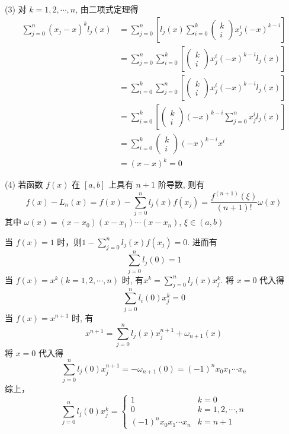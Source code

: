 \begin{tcolorbox}
(3) 对 $ k=1,2, \cdots, n $, 由二项式定理得
$$
\begin{aligned}
\sum_{j=0}^{n}\left(x_{j}-x\right)^{k} l_{j}(x) & =\sum_{j=0}^{n}\left[l_{j}(x) \sum_{i=0}^{k}\left(\begin{array}{l}
k \\
i
\end{array}\right) x_{j}^{i}(-x)^{k-i}\right] \\
& =\sum_{j=0}^{n} \sum_{i=0}^{k}\left[\left(\begin{array}{l}
k \\
i
\end{array}\right) x_{j}^{i}(-x)^{k-i} l_{j}(x)\right] \\
& =\sum_{i=0}^{k} \sum_{j=0}^{n}\left[\left(\begin{array}{l}
k \\
i
\end{array}\right) x_{j}^{i}(-x)^{k-i} l_{j}(x)\right] \\
& =\sum_{i=0}^{k}\left[\left(\begin{array}{l}
k \\
i
\end{array}\right)(-x)^{k-i} \sum_{j=0}^{n} x_{j}^{i} l_{j}(x)\right] \\
& =\sum_{i=0}^{k}\left(\begin{array}{l}
k \\
i
\end{array}\right)(-x)^{k-i} x^{i} \\
& =(x-x)^{k}=0
\end{aligned}
$$


(4) 若函数 $ f(x) $ 在 $ [a, b] $ 上具有 $ n+1 $ 阶导数, 则有
$$
f(x)-L_n(x)=f(x)-\sum_{j=0}^{n} l_{j}(x) f\left(x_{j}\right)=\frac{f^{(n+1)}(\xi)}{(n+1) !} \omega(x)
$$
其中 $ \omega(x)=\left(x-x_{0}\right)\left(x-x_{1}\right) \cdots\left(x-x_{n}\right) $, $\xi \in (a,b)$


当 $ f(x)=1 $ 时，则$1-\sum\limits_{j=0}^{n} l_{j}(x) f\left(x_{j}\right)=0$.
进而有
$$
\sum_{j=0}^{n} l_{j}(0)=1
$$
当 $ f(x)=x^{k}(k=1,2, \cdots, n) $ 时, 有$x^{k}=\sum\limits_{j=0}^{n} l_{j}(x) x_{j}^{k}$.
将 $ x=0 $ 代入得
$$
\sum_{j=0}^{n} l_{i}(0) x_{j}^{k}=0
$$
当 $ f(x)=x^{n+1} $ 时, 有
$$
x^{n+1}=\sum_{j=0}^{n} l_{j}(x) x_{j}^{n+1}+\omega_{n+1}(x)
$$
将 $ x=0 $ 代入得
$$
\sum_{j=0}^{n} l_{j}(0) x_{j}^{n+1}=-\omega_{n+1}(0)=(-1)^{n} x_{0} x_{1} \cdots x_{n}
$$
综上，
$$ \sum\limits_{j=0}^{n} l_{j}(0) x_{j}^{k}=\left\{\begin{array}{ll}1 & k=0 \\ 0 & k=1,2, \cdots, n \\ (-1)^{n} x_{0} x_{1} \cdots x_{n} & k=n+1\end{array}\right. $$


\end{tcolorbox}
